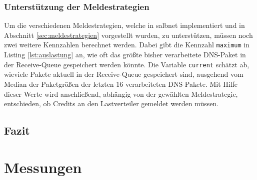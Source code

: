 \documentclass[a4paper, 12pt, BCOR10mm, DIV12, toc=bibliography, toc=listof, german]{scrbook}
\begin{document}
			
			
			
			

			\subsection*{Unterstützung der Meldestrategien} %

			Um die verschiedenen Meldestrategien, welche in salbnet implementiert und in Abschnitt
			\ref{sec:meldestrategien} vorgestellt wurden, zu unterstützen, müssen noch zwei weitere
			Kennzahlen berechnet werden. Dabei gibt die Kennzahl \texttt{maximum} in Listing
			\ref{lst:auslastung} an, wie oft das größte bisher verarbeitete DNS-Paket in der Receive-Queue
			gespeichert werden könnte. Die Variable \texttt{current} schätzt ab, wieviele Pakete aktuell
			in der Receive-Queue gespeichert sind, ausgehend vom Median der Paketgrößen der letzten 16
			verarbeiteten DNS-Pakete.  Mit Hilfe dieser Werte wird anschließend, abhängig von der
			gewählten Meldestrategie, entschieden, ob Credits an den Lastverteiler gemeldet werden müssen.

			



		\section{Fazit} %
		\label{sec:implementierung-fazit}
		


	\chapter{Messungen} %
	\label{cha:Messungen}
\end{document}
